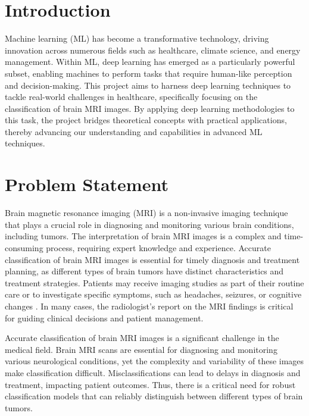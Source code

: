 
\section{Introduction}\label{s:introduction}

Machine learning (ML) has become a transformative technology, driving innovation across numerous fields such as healthcare, climate science, and energy management. Within ML, deep learning has emerged as a particularly powerful subset, enabling machines to perform tasks that require human-like perception and decision-making. This project aims to harness deep learning techniques to tackle real-world challenges in healthcare, specifically focusing on the classification of brain MRI images. By applying deep learning methodologies to this task, the project bridges theoretical concepts with practical applications, thereby advancing our understanding and capabilities in advanced ML techniques.

\section{Problem Statement}\label{s:problem-statement}

Brain magnetic resonance imaging (MRI) is a non-invasive imaging technique that plays a crucial role in diagnosing and monitoring various brain conditions, including tumors. The interpretation of brain MRI images is a complex and time-consuming process, requiring expert knowledge and experience. Accurate classification of brain MRI images is essential for timely diagnosis and treatment planning, as different types of brain tumors have distinct characteristics and treatment strategies. Patients may receive imaging studies as part of their routine care or to investigate specific symptoms, such as headaches, seizures, or cognitive changes \cite{lapointe_primary_2018}. In many cases, the radiologist's report on the MRI findings is critical for guiding clinical decisions and patient management.

Accurate classification of brain MRI images is a significant challenge in the medical field. Brain MRI scans are essential for diagnosing and monitoring various neurological conditions, yet the complexity and variability of these images make classification difficult. Misclassifications can lead to delays in diagnosis and treatment, impacting patient outcomes. Thus, there is a critical need for robust classification models that can reliably distinguish between different types of brain tumors.

